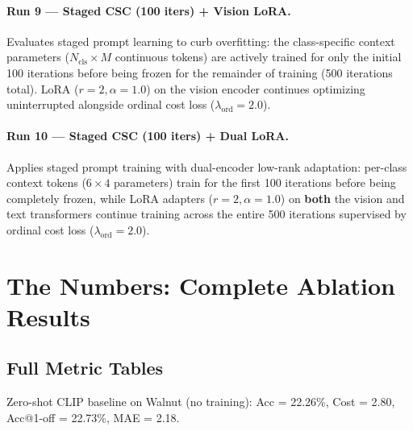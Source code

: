 \documentclass[letterpaper,11pt,leqno]{article}
\begin{document}
\paragraph{Run 9 --- Staged CSC (100 iters) + Vision LoRA.}
Evaluates staged prompt learning to curb overfitting: the class-specific context parameters ($N_\text{cls} \times M$ continuous tokens) are actively trained for only the initial 100 iterations before being frozen for the remainder of training (500 iterations total). LoRA ($r{=}2, \alpha{=}1.0$) on the vision encoder continues optimizing uninterrupted alongside ordinal cost loss ($\lambda_\mathrm{ord}{=}2.0$).

\paragraph{Run 10 --- Staged CSC (100 iters) + Dual LoRA.}
Applies staged prompt training with dual-encoder low-rank adaptation: per-class context tokens ($6 \times 4$ parameters) train for the first 100 iterations before being completely frozen, while LoRA adapters ($r{=}2, \alpha{=}1.0$) on \textbf{both} the vision and text transformers continue training across the entire 500 iterations supervised by ordinal cost loss ($\lambda_\mathrm{ord}{=}2.0$).

\section{The Numbers: Complete Ablation Results}

\subsection{Full Metric Tables}

Zero-shot CLIP baseline on Walnut (no training):
Acc = 22.26\%, Cost = 2.80, Acc@1-off = 22.73\%, MAE = 2.18.
\end{document}
